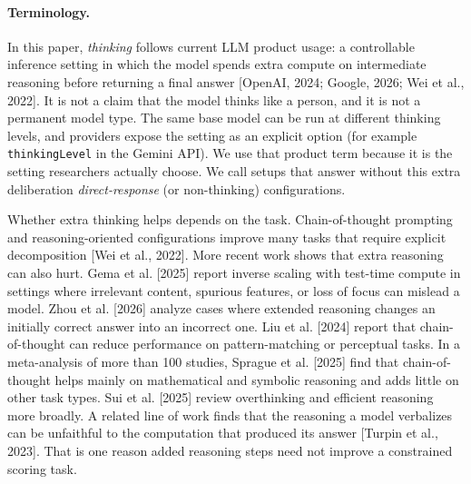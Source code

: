\documentclass[11pt]{article}
\begin{document}
\paragraph{Terminology.}
In this paper, \emph{thinking} follows current LLM product usage: a
controllable inference setting in which the model spends extra compute on
intermediate reasoning before returning a final answer [OpenAI, 2024; Google,
2026; Wei et al., 2022]. It is not a claim that the model thinks like a person,
and it is not a permanent model type. The same base model can be run at
different thinking levels, and providers expose the setting as an explicit
option (for example \texttt{thinkingLevel} in the Gemini API). We use that
product term because it is the setting researchers actually choose. We call
setups that answer without this extra deliberation \emph{direct-response}
(or non-thinking) configurations.

Whether extra thinking helps depends on the task. Chain-of-thought prompting
and reasoning-oriented configurations improve many tasks that require explicit
decomposition [Wei et al., 2022]. More recent work shows that extra reasoning
can also hurt. Gema et al. [2025] report inverse scaling with test-time compute
in settings where irrelevant content, spurious features, or loss of focus can
mislead a model. Zhou et al. [2026] analyze cases where extended reasoning
changes an initially correct answer into an incorrect one. Liu et al. [2024]
report that chain-of-thought can reduce performance on pattern-matching or
perceptual tasks. In a meta-analysis of more than 100 studies, Sprague et al.
[2025] find that chain-of-thought helps mainly on mathematical and symbolic
reasoning and adds little on other task types. Sui et al. [2025] review
overthinking and efficient reasoning more broadly. A related line of work finds
that the reasoning a model verbalizes can be unfaithful to the computation that
produced its answer [Turpin et al., 2023]. That is one reason added reasoning
steps need not improve a constrained scoring task.
\end{document}
